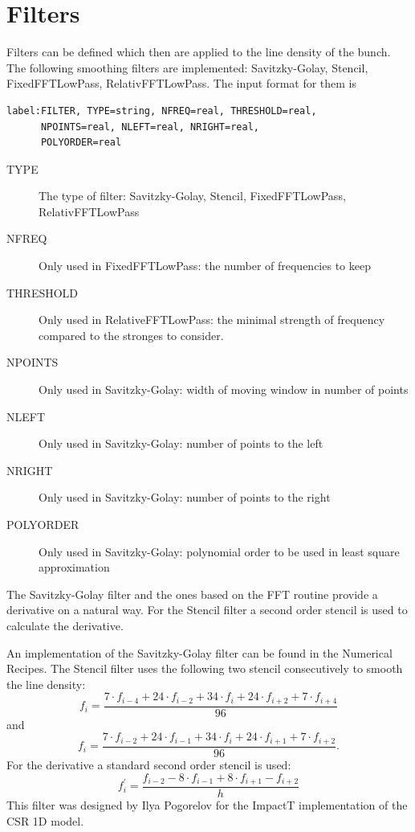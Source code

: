\section{Filters}
Filters can be defined which then are applied to the line density of the bunch. The following smoothing filters are implemented: Savitzky-Golay, Stencil, FixedFFTLowPass, RelativFFTLowPass. The input format for them is
\begin{verbatim}
label:FILTER, TYPE=string, NFREQ=real, THRESHOLD=real, 
      NPOINTS=real, NLEFT=real, NRIGHT=real, 
      POLYORDER=real
\end{verbatim}
\begin{description}
\item[TYPE]
  The type of filter: Savitzky-Golay, Stencil, FixedFFTLowPass, RelativFFTLowPass
\item[NFREQ]
  Only used in FixedFFTLowPass: the number of frequencies to keep
\item[THRESHOLD]
  Only used in RelativeFFTLowPass: the minimal strength of frequency compared to the stronges to consider.
\item[NPOINTS]
  Only used in Savitzky-Golay: width of moving window in number of points
\item[NLEFT]
  Only used in Savitzky-Golay: number of points to the left
\item[NRIGHT]
  Only used in Savitzky-Golay: number of points to the right
\item[POLYORDER]
  Only used in Savitzky-Golay: polynomial order to be used in least square approximation
\end{description}
The Savitzky-Golay filter and the ones based on the FFT routine provide a derivative on a natural way. For the Stencil filter a second order stencil is used to calculate the derivative.

An implementation of the Savitzky-Golay filter can be found in the Numerical Recipes. The Stencil filter uses the following two stencil consecutively to smooth the line density:
$$f_i = \frac{7\cdot f_{i-4} + 24\cdot f_{i-2} + 34\cdot f_{i} + 24\cdot f_{i+2} + 7\cdot f_{i+4}}{96}$$
and
$$f_i = \frac{7\cdot f_{i-2} + 24\cdot f_{i-1} + 34\cdot f_{i} + 24\cdot f_{i+1} + 7\cdot f_{i+2}}{96}.$$
For the derivative a standard second order stencil is used:
$$f^{\prime}_i = \frac{f_{i-2} - 8\cdot f_{i-1} + 8\cdot f_{i+1} - f_{i+2}}{h}$$
This filter was designed by Ilya Pogorelov for the ImpactT implementation of the CSR 1D model.

